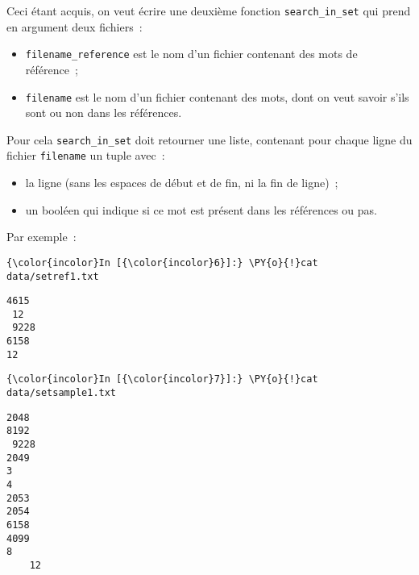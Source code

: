     Ceci étant acquis, on veut écrire une deuxième fonction
\texttt{search\_in\_set} qui prend en argument deux fichiers~:

\begin{itemize}
\tightlist
\item
  \texttt{filename\_reference} est le nom d'un fichier contenant des
  mots de référence~;
\item
  \texttt{filename} est le nom d'un fichier contenant des mots, dont on
  veut savoir s'ils sont ou non dans les références.
\end{itemize}

Pour cela \texttt{search\_in\_set} doit retourner une liste, contenant
pour chaque ligne du fichier \texttt{filename} un tuple avec~:

\begin{itemize}
\tightlist
\item
  la ligne (sans les espaces de début et de fin, ni la fin de ligne)~;
\item
  un booléen qui indique si ce mot est présent dans les références ou
  pas.
\end{itemize}

Par exemple~:

    \begin{Verbatim}[commandchars=\\\{\},frame=single,framerule=0.3mm,rulecolor=\color{cellframecolor}]
{\color{incolor}In [{\color{incolor}6}]:} \PY{o}{!}cat data/setref1.txt
\end{Verbatim}


    \begin{Verbatim}[commandchars=\\\{\},frame=single,framerule=0.3mm,rulecolor=\color{cellframecolor}]
4615
 12
 9228
6158
12
\end{Verbatim}

    \begin{Verbatim}[commandchars=\\\{\},frame=single,framerule=0.3mm,rulecolor=\color{cellframecolor}]
{\color{incolor}In [{\color{incolor}7}]:} \PY{o}{!}cat data/setsample1.txt
\end{Verbatim}


    \begin{Verbatim}[commandchars=\\\{\},frame=single,framerule=0.3mm,rulecolor=\color{cellframecolor}]
2048
8192
 9228
2049
3
4
2053
2054
6158  
4099
8
    12
\end{Verbatim}

